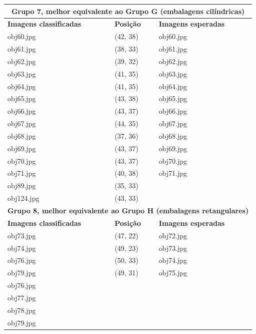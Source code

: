 \begin{center}
\begin{longtable}{|l|l|l|}
    \multicolumn{3}{|c|}{\textbf{Grupo 7, melhor equivalente ao Grupo G
      (embalagens cilíndricas)}} \\
    \hline\hline
    \textbf{Imagens classificadas} & \textbf{Posição} & \textbf{Imagens esperadas} \\
    \hline\hline

    obj60.jpg  & (42, 38) & obj60.jpg \\
    \hline
    obj61.jpg  & (38, 33) & obj61.jpg \\
    \hline
    obj62.jpg  & (39, 32) & obj62.jpg \\
    \hline
    obj63.jpg  & (41, 35) & obj63.jpg \\
    \hline
    obj64.jpg  & (41, 35) & obj64.jpg \\
    \hline
    obj65.jpg  & (43, 38) & obj65.jpg \\
    \hline
    obj66.jpg  & (43, 37) & obj66.jpg \\
    \hline
    obj67.jpg  & (44, 35) & obj67.jpg \\
    \hline
    obj68.jpg  & (37, 36) & obj68.jpg \\
    \hline
    obj69.jpg  & (43, 37) & obj69.jpg \\
    \hline
    obj70.jpg  & (43, 37) & obj70.jpg \\
    \hline
    obj71.jpg  & (40, 38) & obj71.jpg \\
    \hline
    obj89.jpg  & (35, 33) & \\
    \hline
    obj124.jpg & (43, 33) & \\
    \hline\hline

    \multicolumn{3}{|c|}{\textbf{Grupo 8, melhor equivalente ao Grupo H
      (embalagens retangulares)}} \\
    \hline\hline
    \textbf{Imagens classificadas} & \textbf{Posição} & \textbf{Imagens esperadas} \\
    \hline\hline

    obj73.jpg & (47, 22) & obj72.jpg \\
    \hline
    obj74.jpg & (49, 23) & obj73.jpg \\
    \hline
    obj76.jpg & (50, 33) & obj74.jpg \\
    \hline
    obj79.jpg & (49, 31) & obj75.jpg \\
    \hline
    obj76.jpg & & \\
    \hline
    obj77.jpg & & \\
    \hline
    obj78.jpg & & \\
    \hline
    obj79.jpg & & \\
    \hline\hline


\end{longtable}
\end{center}
